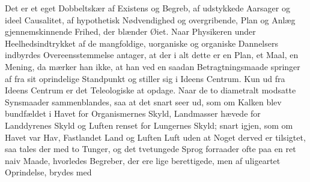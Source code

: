 \documentclass[12pt,a4paper]{book}
\begin{document}
Det er et eget Dobbeltskær af Existens og Begreb, af udstykkede Aarsager og
ideel Causalitet, af hypothetisk Nødvendighed og overgribende, Plan og Anlæg
gjennemskinnende Frihed, der blænder Øiet. Naar Physikeren under
Heelhedsindtrykket af de mangfoldige, uorganiske og organiske Dannelsers
indbyrdes Overeensstemmelse antager, at der i alt dette er en Plan, et Maal,
en Mening, da mærker han ikke, at han ved en saadan Betragtningsmaade
springer af fra sit oprindelige Standpunkt og stiller sig i Ideens Centrum.
Kun ud fra Ideens Centrum er det Teleologiske at opdage. Naar de to diametralt
modsatte Synsmaader sammenblandes, saa at det snart seer ud, som om Kalken
blev bundfældet i Havet for Organismernes Skyld, Landmasser hævede for
Landdyrenes Skyld og Luften renset for Lungernes Skyld; snart igjen, som om
Havet var Hav, Fastlandet Land og Luften Luft uden at Noget derved er
tilsigtet, saa tales der med to Tunger, og det tvetungede Sprog forraader ofte
paa en ret naiv Maade, hvorledes Begreber, der ere lige berettigede, men af
uligeartet Oprindelse, brydes med
\end{document}
